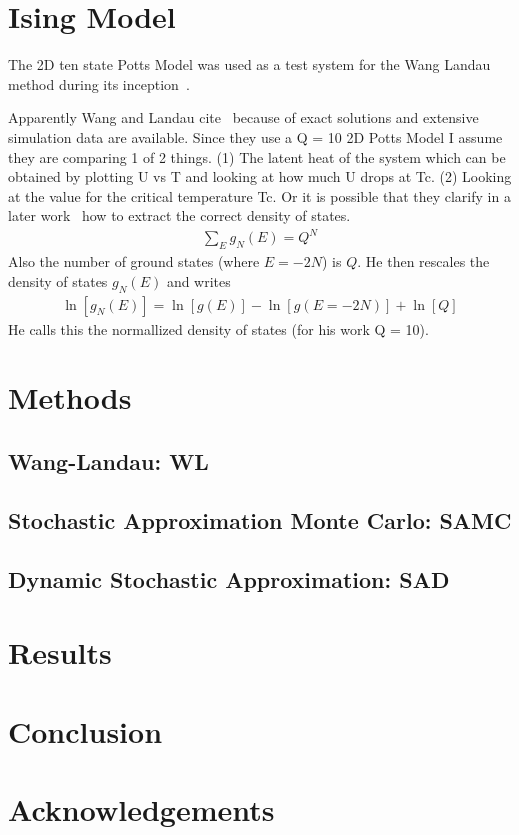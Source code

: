 \documentclass[letterpaper,twocolumn,amsmath,amssymb,pre,aps,10pt]{revtex4-1}
\begin{document}
\section{Ising Model}
The 2D ten state Potts Model was used as a test system for the Wang 
Landau method during its inception~\cite{wang2001determining,wang2001efficient}.

Apparently Wang and Landau cite~\cite{wu1982potts} because of exact solutions 
and extensive simulation data are available. Since they use a Q = 10 2D Potts
Model I assume they are comparing 1 of 2 things.
(1) The latent heat of the system which can be obtained by plotting U vs T
and looking at how much U drops at Tc.
(2) Looking at the value for the critical temperature Tc.
Or it is possible that they clarify in a later work~\cite{landau2004new} how
to extract the correct density of states. 
\begin{align}
\sum_E g_N\left( E\right)=Q^N
\end{align}
Also the number of ground states (where $E = -2N$) is $Q$. He then rescales
the density of states $g_N\left( E\right)$ and writes
\begin{align}
\ln \left[ g_N\left(E\right)\right]=\ln \left[ g\left( E\right)\right]
-\ln \left[ g\left(E=-2N\right)\right]+\ln\left[ Q \right]
\end{align}
He calls this the normallized density of states (for his work Q = 10).

\section{Methods}
\subsection{Wang-Landau: WL}

\subsection{Stochastic Approximation Monte Carlo: SAMC}

\subsection{Dynamic Stochastic Approximation: SAD}

\section{Results}
\section{Conclusion}
\section{Acknowledgements}

\maketitle


\end{document}
